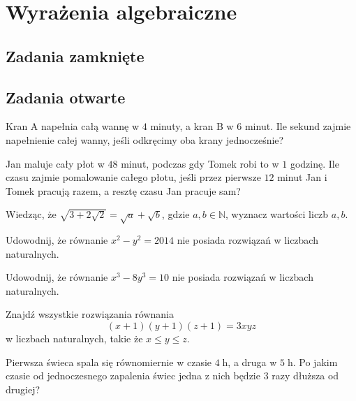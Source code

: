 \setcounter{parc}{0}
\addtocounter{chapc}{1}

\chapter{Wyrażenia algebraiczne}

\section{Zadania zamknięte}

\section{Zadania otwarte}

\zadanie Kran A napełnia całą wannę w $4$ minuty, a kran B w $6$ minut. Ile sekund zajmie napełnienie całej wanny, jeśli odkręcimy oba krany jednocześnie?

\zadanie Jan maluje cały płot w $48$ minut, podczas gdy Tomek robi to w $1$ godzinę. Ile czasu zajmie pomalowanie całego płotu, jeśli przez pierwsze $12$ minut Jan i Tomek pracują razem, a resztę czasu Jan pracuje sam?

\zadanie Wiedząc, że $\sqrt{3 + 2\sqrt{2}} = \sqrt{a} + \sqrt{b}$, gdzie $a, b \in \mathbb{N}$, wyznacz wartości liczb $a, b$. %

\zadanie Udowodnij, że równanie $x^2 - y^2 = 2014$ nie posiada rozwiązań w liczbach naturalnych.

\zadanie Udowodnij, że równanie $x^3 - 8y^3 = 10$ nie posiada rozwiązań w liczbach naturalnych.

\zadanie Znajdź wszystkie rozwiązania równania \[{(x + 1)(y + 1)(z + 1) = 3xyz}\] w liczbach naturalnych, takie że $x \leqslant y \leqslant z$.

\zadanie Pierwsza świeca spala się równomiernie w czasie $4\;$h, a druga w $5\;$h. Po jakim czasie od jednoczesnego zapalenia świec jedna z nich będzie $3$ razy dłuższa od drugiej? %

